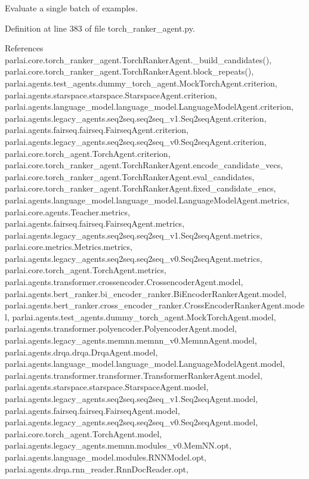 \begin{DoxyVerb}Evaluate a single batch of examples.\end{DoxyVerb}
 

Definition at line 383 of file torch\+\_\+ranker\+\_\+agent.\+py.



References parlai.\+core.\+torch\+\_\+ranker\+\_\+agent.\+Torch\+Ranker\+Agent.\+\_\+build\+\_\+candidates(), parlai.\+core.\+torch\+\_\+ranker\+\_\+agent.\+Torch\+Ranker\+Agent.\+block\+\_\+repeats(), parlai.\+agents.\+test\+\_\+agents.\+dummy\+\_\+torch\+\_\+agent.\+Mock\+Torch\+Agent.\+criterion, parlai.\+agents.\+starspace.\+starspace.\+Starspace\+Agent.\+criterion, parlai.\+agents.\+language\+\_\+model.\+language\+\_\+model.\+Language\+Model\+Agent.\+criterion, parlai.\+agents.\+legacy\+\_\+agents.\+seq2seq.\+seq2seq\+\_\+v1.\+Seq2seq\+Agent.\+criterion, parlai.\+agents.\+fairseq.\+fairseq.\+Fairseq\+Agent.\+criterion, parlai.\+agents.\+legacy\+\_\+agents.\+seq2seq.\+seq2seq\+\_\+v0.\+Seq2seq\+Agent.\+criterion, parlai.\+core.\+torch\+\_\+agent.\+Torch\+Agent.\+criterion, parlai.\+core.\+torch\+\_\+ranker\+\_\+agent.\+Torch\+Ranker\+Agent.\+encode\+\_\+candidate\+\_\+vecs, parlai.\+core.\+torch\+\_\+ranker\+\_\+agent.\+Torch\+Ranker\+Agent.\+eval\+\_\+candidates, parlai.\+core.\+torch\+\_\+ranker\+\_\+agent.\+Torch\+Ranker\+Agent.\+fixed\+\_\+candidate\+\_\+encs, parlai.\+agents.\+language\+\_\+model.\+language\+\_\+model.\+Language\+Model\+Agent.\+metrics, parlai.\+core.\+agents.\+Teacher.\+metrics, parlai.\+agents.\+fairseq.\+fairseq.\+Fairseq\+Agent.\+metrics, parlai.\+agents.\+legacy\+\_\+agents.\+seq2seq.\+seq2seq\+\_\+v1.\+Seq2seq\+Agent.\+metrics, parlai.\+core.\+metrics.\+Metrics.\+metrics, parlai.\+agents.\+legacy\+\_\+agents.\+seq2seq.\+seq2seq\+\_\+v0.\+Seq2seq\+Agent.\+metrics, parlai.\+core.\+torch\+\_\+agent.\+Torch\+Agent.\+metrics, parlai.\+agents.\+transformer.\+crossencoder.\+Crossencoder\+Agent.\+model, parlai.\+agents.\+bert\+\_\+ranker.\+bi\+\_\+encoder\+\_\+ranker.\+Bi\+Encoder\+Ranker\+Agent.\+model, parlai.\+agents.\+bert\+\_\+ranker.\+cross\+\_\+encoder\+\_\+ranker.\+Cross\+Encoder\+Ranker\+Agent.\+model, parlai.\+agents.\+test\+\_\+agents.\+dummy\+\_\+torch\+\_\+agent.\+Mock\+Torch\+Agent.\+model, parlai.\+agents.\+transformer.\+polyencoder.\+Polyencoder\+Agent.\+model, parlai.\+agents.\+legacy\+\_\+agents.\+memnn.\+memnn\+\_\+v0.\+Memnn\+Agent.\+model, parlai.\+agents.\+drqa.\+drqa.\+Drqa\+Agent.\+model, parlai.\+agents.\+language\+\_\+model.\+language\+\_\+model.\+Language\+Model\+Agent.\+model, parlai.\+agents.\+transformer.\+transformer.\+Transformer\+Ranker\+Agent.\+model, parlai.\+agents.\+starspace.\+starspace.\+Starspace\+Agent.\+model, parlai.\+agents.\+legacy\+\_\+agents.\+seq2seq.\+seq2seq\+\_\+v1.\+Seq2seq\+Agent.\+model, parlai.\+agents.\+fairseq.\+fairseq.\+Fairseq\+Agent.\+model, parlai.\+agents.\+legacy\+\_\+agents.\+seq2seq.\+seq2seq\+\_\+v0.\+Seq2seq\+Agent.\+model, parlai.\+core.\+torch\+\_\+agent.\+Torch\+Agent.\+model, parlai.\+agents.\+legacy\+\_\+agents.\+memnn.\+modules\+\_\+v0.\+Mem\+N\+N.\+opt, parlai.\+agents.\+language\+\_\+model.\+modules.\+R\+N\+N\+Model.\+opt, parlai.\+agents.\+drqa.\+rnn\+\_\+reader.\+Rnn\+Doc\+Reader.\+opt, 